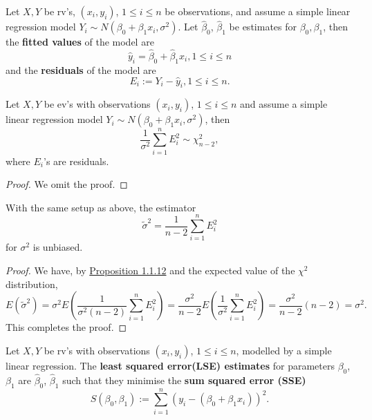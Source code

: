 \documentclass[11pt,fleqn]{book} %
\begin{document}
\begin{definition} \label{def:1112}
Let \(X, Y\) be rv's, \((x_i, y_i)\), \(1 \leq i \leq n\) be observations, and assume a simple linear regression model \(Y_i \sim N(\beta_0 + \beta_1x_i, \sigma^2)\). Let \(\hat{\beta}_0\), \(\hat{\beta}_1\) be estimates for \(\beta_0, \beta_1\), then the \textbf{fitted values} of the model are
\[
\hat{y}_i = \hat{\beta}_0 + \hat{\beta}_1x_i, 1 \leq i \leq n
\]
and the \textbf{residuals} of the model are 
\[
E_i := Y_i - \hat{y}_i, 1 \leq i \leq n.
\]
\end{definition}

\begin{proposition} \label{prop:1113}
Let \(X, Y\) be ev's with observations \((x_i, y_i)\), \(1 \leq i \leq n\) and assume a simple linear regression model \(Y_i \sim N(\beta_0 + \beta_1x_i, \sigma^2)\), then
\[
\frac{1}{\sigma^2}\sum_{i=1}^n E_i^2 \sim \chi^2_{n - 2},
\]
where \(E_i\)'s are residuals.
\end{proposition}
\begin{proof} We omit the proof.\end{proof}

\begin{corollary} \label{cor:1114}
With the same setup as above, the estimator
\[
\tilde{\sigma}^2 = \frac{1}{n - 2}\sum_{i=1}^n E_i^2
\]
for \(\sigma^2\) is unbiased.
\end{corollary}
\begin{proof} We have, by \hyperref[prop:1118]{Proposition 1.1.12} and the expected value of the \(\chi^2\) distribution,
\[
E(\tilde{\sigma}^2) = \sigma^2E\left(\frac{1}{\sigma^2(n - 2)}\sum_{i=1}^nE_i^2\right) = \frac{\sigma^2}{n - 2}E\left(\frac{1}{\sigma^2}\sum_{i=1}^nE_i^2\right) = \frac{\sigma^2}{n - 2}(n - 2) = \sigma^2.
\]
\indent This completes the proof.
\end{proof}

\begin{definition} \label{def:1115}
Let \(X, Y\) be rv's with observations \((x_i, y_i)\), \(1 \leq i \leq n\), modelled by a simple linear regression. The \textbf{least squared error(LSE) estimates} for parameters \(\beta_0\), \(\beta_1\) are \(\hat{\beta}_0\), \(\hat{\beta}_1\) such that they minimise the \textbf{sum squared error (SSE)}
\[
S(\beta_0, \beta_1) := \sum_{i=1}^n (y_i - (\beta_0 + \beta_1x_i))^2.
\]
\end{definition}
\end{document}
